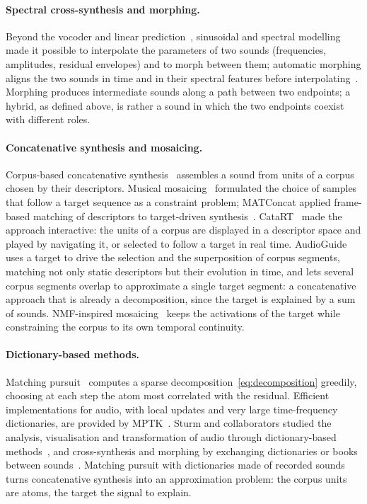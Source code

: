 \documentclass[11pt,a4paper]{article}
\begin{document}
\paragraph{Spectral cross-synthesis and morphing.} Beyond the vocoder and
linear prediction~\cite{dudley1939,moorer1979,dolson1986}, sinusoidal and
spectral modelling~\cite{serra1990} made it possible to interpolate the
parameters of two sounds (frequencies, amplitudes, residual envelopes) and
to morph between them; automatic morphing aligns the two sounds in time and
in their spectral features before interpolating~\cite{slaney1996,caetano2011}.
Morphing produces intermediate sounds along a path between two endpoints; a
hybrid, as defined above, is rather a sound in which the two endpoints
coexist with different roles.

\paragraph{Concatenative synthesis and mosaicing.} Corpus-based concatenative
synthesis~\cite{schwarz2007} assembles a sound from units of a corpus chosen
by their descriptors. Musical mosaicing~\cite{zils2001} formulated the choice
of samples that follow a target sequence as a constraint problem; MATConcat
applied frame-based matching of descriptors to target-driven
synthesis~\cite{sturm2004}. CataRT~\cite{schwarz2006} made the approach
interactive: the units of a corpus are displayed in a descriptor space and
played by navigating it, or selected to follow a target in real time.
AudioGuide~\cite{hackbarth2013} uses a target to drive the selection and the
superposition of corpus segments, matching not only static descriptors but
their evolution in time, and lets several corpus segments overlap to
approximate a single target segment: a concatenative approach that is already
a decomposition, since the target is explained by a sum of sounds.
NMF-inspired mosaicing~\cite{driedger2015} keeps the activations of the
target while constraining the corpus to its own temporal continuity.

\paragraph{Dictionary-based methods.} Matching pursuit~\cite{mallat1993}
computes a sparse decomposition~\eqref{eq:decomposition} greedily, choosing
at each step the atom most correlated with the residual. Efficient
implementations for audio, with local updates and very large time-frequency
dictionaries, are provided by MPTK~\cite{krstulovic2006}. Sturm and
collaborators studied the analysis, visualisation and transformation of audio
through dictionary-based methods~\cite{sturm2009}, and cross-synthesis and
morphing by exchanging dictionaries or books between
sounds~\cite{collins2011}. Matching pursuit with dictionaries made of
recorded sounds turns concatenative synthesis into an approximation problem:
the corpus units are atoms, the target the signal to explain.
\end{document}
